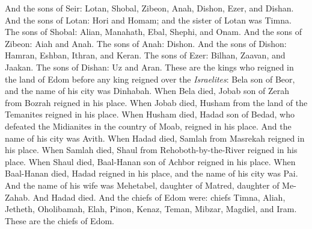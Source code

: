 \begin{biblechapter}
\verse And the sons of Seir: Lotan, Shobal, Zibeon, Anah, Dishon, Ezer, and Dishan.
\verse And the sons of Lotan: Hori and Homam; and the sister of Lotan was Timna.
\verse The sons of Shobal: Alian, Manahath, Ebal, Shephi, and Onam. And the sons of Zibeon: Aiah and Anah.
\verse The sons of Anah: Dishon. And the sons of Dishon: Hamran, Eshban, Ithran, and Keran.
\verse The sons of Ezer: Bilhan, Zaavan, and Jaakan. The sons of Dishan: Uz and Aran.
\verse These are the kings who reigned in the land of Edom before any king reigned over the \textit{Israelites}: Bela son of Beor, and the name of his city was Dinhabah.
\verse When Bela died, Jobab son of Zerah from Bozrah reigned in his place.
\verse When Jobab died, Husham from the land of the Temanites reigned in his place.
\verse When Husham died, Hadad son of Bedad, who defeated the Midianites in the country of Moab, reigned in his place. And the name of his city was Avith.
\verse When Hadad died, Samlah from Masrekah reigned in his place.
\verse When Samlah died, Shaul from Rehoboth-by-the-River reigned in his place.
\verse When Shaul died, Baal-Hanan son of Achbor reigned in his place.
\verse When Baal-Hanan died, Hadad reigned in his place, and the name of his city was Pai. And the name of his wife was Mehetabel, daughter of Matred, daughter of Me-Zahab.
\verse And Hadad died. And the chiefs of Edom were: chiefs Timna, Aliah, Jetheth,
\verse Oholibamah, Elah, Pinon,
\verse Kenaz, Teman, Mibzar,
\verse Magdiel, and Iram. These are the chiefs of Edom.
\end{biblechapter}


